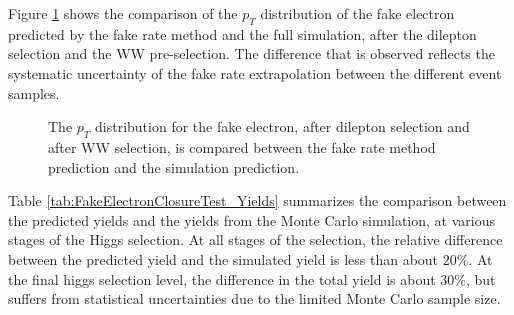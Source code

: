 Figure \ref{fig:FakeElectronClosureTest_FakeElePt} shows the comparison of the $p_{T}$
distribution of the fake electron predicted by the fake rate method and the full simulation,
after the dilepton selection and the WW pre-selection. The difference that is observed 
reflects the systematic uncertainty of the fake rate extrapolation between the different
event samples. 

\begin{figure}[!htbp]
\begin{center}
\caption{The $p_{T}$ distribution for the fake electron, after dilepton selection and after
WW selection, is compared between the fake rate method prediction and the simulation prediction. }
\label{fig:FakeElectronClosureTest_FakeElePt}
\end{center}
\end{figure}

Table \ref{tab:FakeElectronClosureTest_Yields} summarizes the comparison between the
predicted yields and the yields from the Monte Carlo simulation, at various stages
of the Higgs selection. At all stages of the selection, the relative difference
between the predicted yield and the simulated yield is less than about $20\%$. 
At the final higgs selection level, the difference in the total yield is about
$30\%$, but suffers from statistical uncertainties due to the limited Monte Carlo 
sample size. 

